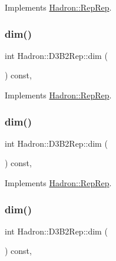 Implements \mbox{\hyperlink{structHadron_1_1RepRep_a92c8802e5ed7afd7da43ccfd5b7cd92b}{Hadron\+::\+Rep\+Rep}}.

\mbox{\label{structHadron_1_1D3B2Rep_a5b1737e056dda55a033851622de1412c}} 
\subsubsection{\texorpdfstring{dim()}{dim()}\hspace{0.1cm}{\footnotesize\ttfamily [3/5]}}
{\footnotesize\ttfamily int Hadron\+::\+D3\+B2\+Rep\+::dim (\begin{DoxyParamCaption}{ }\end{DoxyParamCaption}) const\hspace{0.3cm}{\ttfamily [inline]}, {\ttfamily [virtual]}}



Implements \mbox{\hyperlink{structHadron_1_1RepRep_a92c8802e5ed7afd7da43ccfd5b7cd92b}{Hadron\+::\+Rep\+Rep}}.

\mbox{\label{structHadron_1_1D3B2Rep_a5b1737e056dda55a033851622de1412c}} 
\subsubsection{\texorpdfstring{dim()}{dim()}\hspace{0.1cm}{\footnotesize\ttfamily [4/5]}}
{\footnotesize\ttfamily int Hadron\+::\+D3\+B2\+Rep\+::dim (\begin{DoxyParamCaption}{ }\end{DoxyParamCaption}) const\hspace{0.3cm}{\ttfamily [inline]}, {\ttfamily [virtual]}}



Implements \mbox{\hyperlink{structHadron_1_1RepRep_a92c8802e5ed7afd7da43ccfd5b7cd92b}{Hadron\+::\+Rep\+Rep}}.

\mbox{\label{structHadron_1_1D3B2Rep_a5b1737e056dda55a033851622de1412c}} 
\subsubsection{\texorpdfstring{dim()}{dim()}\hspace{0.1cm}{\footnotesize\ttfamily [5/5]}}
{\footnotesize\ttfamily int Hadron\+::\+D3\+B2\+Rep\+::dim (\begin{DoxyParamCaption}{ }\end{DoxyParamCaption}) const\hspace{0.3cm}{\ttfamily [inline]}, {\ttfamily [virtual]}}



